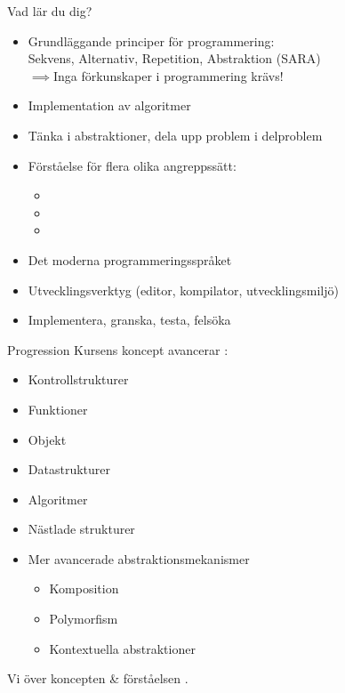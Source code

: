 \begin{Slide}{Vad lär du dig?}
\begin{itemize}
\item Grundläggande principer för programmering:\\ Sekvens, Alternativ, Repetition, Abstraktion (SARA)\\$\implies$Inga förkunskaper i programmering krävs!
\item Implementation av algoritmer
\item Tänka i abstraktioner, dela upp problem i delproblem
\item Förståelse för flera olika angreppssätt:
\begin{itemize}
\item {}%
\item {}%
\item {}%
\end{itemize}
\item Det moderna programmeringsspråket  %
\item Utvecklingsverktyg (editor, kompilator, utvecklingsmiljö)
\item Implementera, granska, testa, felsöka
\end{itemize}
\end{Slide}

\begin{Slide}{Progression}
Kursens koncept avancerar :
\begin{itemize}
\item Kontrollstrukturer
\item Funktioner
\item Objekt
\item Datastrukturer 
\item Algoritmer
\item Nästlade strukturer
\item Mer avancerade abstraktionsmekanismer
\begin{itemize}
\item Komposition
\item Polymorfism
\item Kontextuella abstraktioner
\end{itemize}
\end{itemize}
Vi  över koncepten \&  förståelsen .
\end{Slide}


